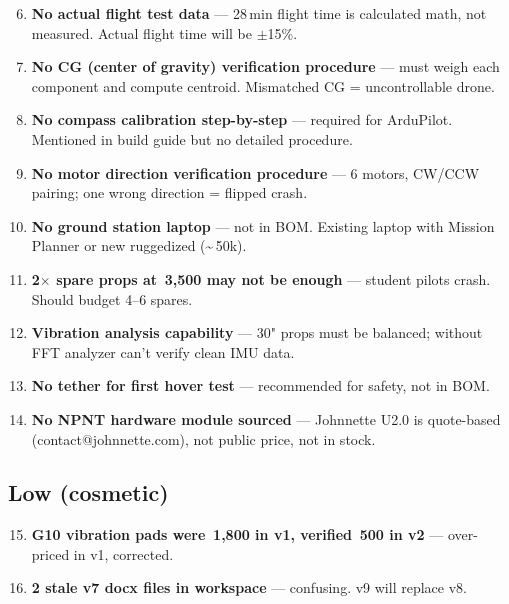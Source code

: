 \documentclass[11pt,a4paper]{article}
\newcommand{\Rs}{\rupee\,}
\begin{document}
\begin{enumerate}
  \setcounter{enumi}{5}
  \item \textbf{No actual flight test data} --- 28\,min flight time is calculated math, not measured. Actual flight time will be $\pm$15\%.
  \item \textbf{No CG (center of gravity) verification procedure} --- must weigh each component and compute centroid. Mismatched CG = uncontrollable drone.
  \item \textbf{No compass calibration step-by-step} --- required for ArduPilot. Mentioned in build guide but no detailed procedure.
  \item \textbf{No motor direction verification procedure} --- 6 motors, CW/CCW pairing; one wrong direction = flipped crash.
  \item \textbf{No ground station laptop} --- not in BOM. Existing laptop with Mission Planner or new ruggedized (\textasciitilde{}\Rs{}50k).
  \item \textbf{2$\times$ spare props at \Rs{}3,500 may not be enough} --- student pilots crash. Should budget 4--6 spares.
  \item \textbf{Vibration analysis capability} --- 30" props must be balanced; without FFT analyzer can't verify clean IMU data.
  \item \textbf{No tether for first hover test} --- recommended for safety, not in BOM.
  \item \textbf{No NPNT hardware module sourced} --- Johnnette U2.0 is quote-based (contact@johnnette.com), not public price, not in stock.
\end{enumerate}

\subsection{Low (cosmetic)}

\begin{enumerate}
  \setcounter{enumi}{14}
  \item \textbf{G10 vibration pads were \Rs{}1,800 in v1, verified \Rs{}500 in v2} --- over-priced in v1, corrected.
  \item \textbf{2 stale v7 docx files in workspace} --- confusing. v9 will replace v8.
\end{enumerate}

\end{document}
